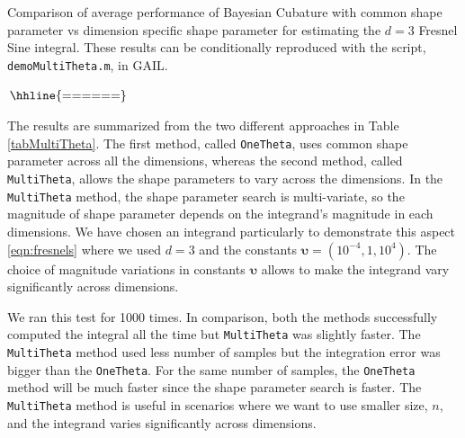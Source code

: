 \documentclass{iitthesis}          %
\newcommand{\bm}[1]{\boldsymbol{#1}}
\newcommand{\code}[1]{\texttt{#1}}
\begin{document}
{{{{{{\begin{table}[ht] %
	\centering
	\caption{Comparison of average performance of Bayesian Cubature with common shape parameter vs dimension specific shape parameter
		 for estimating the $d=3$ Fresnel Sine integral. These results can be conditionally reproduced with the script, \code{demoMultiTheta.m}, in GAIL. 
		\label{tabMultiTheta}}	   
	$
	\arraycolsep=1.4pt\def\arraystretch{0.9}
\begin{array}{l@{\quad}r@{\quad}r@{\quad}r@{\quad}r@{\quad}r@{\quad}r}
\hhline{======}
 
\end{array}	
	$
\end{table}

The results are summarized from the two different approaches in Table \ref{tabMultiTheta}. The first method, called \code{OneTheta}, uses common shape parameter across all the dimensions, whereas the second method, called \code{MultiTheta}, allows the shape parameters to vary across the dimensions. In the \code{MultiTheta} method, the shape parameter search is multi-variate, so the magnitude of shape parameter depends on the integrand's magnitude in each dimensions. We have chosen an integrand particularly to demonstrate this aspect \eqref{eqn:fresnels} where we used $d=3$ and the constants $\bm{\upsilon}= (10^{-4}, 1, 10^4)$. The choice of magnitude variations in constants $\bm{\upsilon}$ allows to make the integrand vary significantly across dimensions.

We ran this test for 1000 times. In comparison, both the methods successfully computed the integral all the time but \code{MultiTheta} was slightly faster. The \code{MultiTheta} method used less number of samples but the integration error was bigger than the \code{OneTheta}. For the same number of samples, the \code{OneTheta} method will be much faster since the shape parameter search is faster. The \code{MultiTheta} method is useful in scenarios where we want to use smaller size, $n$, and the integrand varies significantly across dimensions.


\iffalse


}}}}}}
\end{document}
